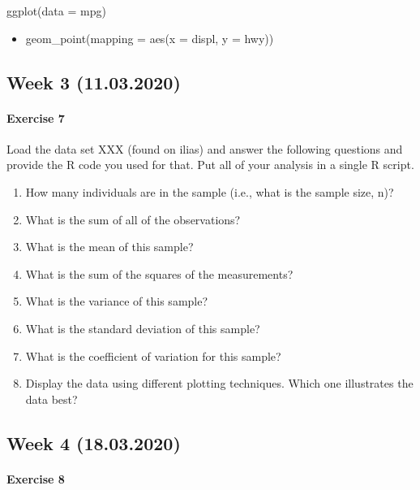 \documentclass[]{article}
\providecommand{\tightlist}{%
  \setlength{\itemsep}{0pt}\setlength{\parskip}{0pt}}
\let\oldparagraph\paragraph
\renewcommand{\paragraph}[1]{\oldparagraph{#1}\mbox{}}
\begin{document}
ggplot(data = mpg)

\begin{itemize}
\tightlist
\item
  geom\_point(mapping = aes(x = displ, y = hwy))
\end{itemize}

\hypertarget{week-3-11.03.2020}{%
\subsection{Week 3 (11.03.2020)}\label{week-3-11.03.2020}}

\hypertarget{exercise-7}{%
\paragraph{Exercise 7}\label{exercise-7}}

Load the data set XXX (found on ilias) and answer the following
questions and provide the R code you used for that. Put all of your
analysis in a single R script.

\begin{enumerate}
\def\labelenumi{\alph{enumi})}
\tightlist
\item
  How many individuals are in the sample (i.e., what is the sample size,
  n)?
\item
  What is the sum of all of the observations?
\item
  What is the mean of this sample?\\
\item
  What is the sum of the squares of the measurements?
\item
  What is the variance of this sample?
\item
  What is the standard deviation of this sample?
\item
  What is the coefficient of variation for this sample?
\item
  Display the data using different plotting techniques. Which one
  illustrates the data best?
\end{enumerate}

\hypertarget{week-4-18.03.2020}{%
\subsection{Week 4 (18.03.2020)}\label{week-4-18.03.2020}}

\hypertarget{exercise-8}{%
\paragraph{Exercise 8}\label{exercise-8}}
\end{document}
